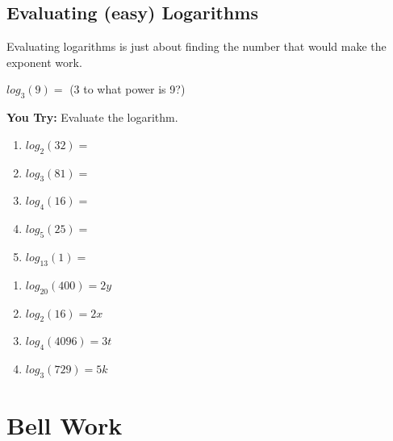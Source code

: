 \documentclass[12pt]{article}
\begin{document}
\subsection{Evaluating (easy) Logarithms}

Evaluating logarithms is just about finding the number that would make the exponent work.\\

\begin{center} $log_{3}(9)=$ (3 to what power is 9?)\end{center}

\textbf{You Try:} Evaluate the logarithm.\\

\begin{enumerate}
	\setlength\itemsep{1cm}
	
	\item $log_{2}(32)=$\\
	
	\item $log_{3}(81)=$\\
	
	\item $log_{4}(16)=$\\
	
	\item $log_{5}(25)=$\\
	
	\item $log_{13}(1)=$\\
\end{enumerate}

\clearpage



\begin{enumerate}

	\item $log_{20}(400)=2y$\\
	
	\item $log_{2}(16)=2x$\\
	
	\item $log_{4}(4096)=3t$\\
	
	\item $log_{3}(729)=5k$\\
\end{enumerate}

\section*{Bell Work}
\end{document}
